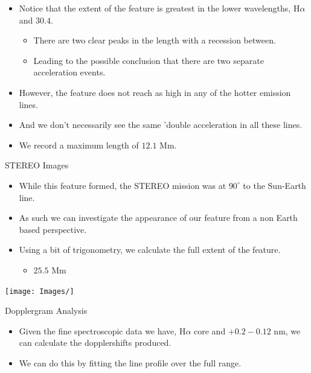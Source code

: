 \documentclass{beamer}
\begin{document}

	\begin{frame}
	\end{frame}


	\begin{frame}
		\begin{itemize}
			\item{Notice that the extent of the feature is greatest in the lower wavelengths, H$\alpha$ and $30.4$.}
			\begin{itemize}
				\item{There are two clear peaks in the length with a recession between.}
				\item{Leading to the possible conclusion that there are two separate acceleration events.}
			\end{itemize}
			\item{However, the feature does not reach as high in any of the hotter emission lines.}
			\item{And we don't necessarily see the same 'double acceleration in all these lines.}
			\item{We record a maximum length of $12.1$ Mm.}
		\end{itemize}
	\end{frame}

	
	\begin{frame}{STEREO Images}
		\begin{itemize}
			\item{While this feature formed, the STEREO mission was at $90^\circ$ to the Sun-Earth line.}
			\item{As such we can investigate the appearance of our feature from a non Earth based perspective.}
			\item{Using a bit of trigonometry, we calculate the full extent of the feature.}
			\begin{itemize}
				\item{$\mathbf{25.5}$ Mm}
			\end{itemize}
		\end{itemize}
		\texttt{[image: Images/]}
	\end{frame}
	
	\begin{frame}{Dopplergram Analysis}
		\begin{itemize}
			\item{Given the fine spectroscopic data we have, H$\alpha$ core and $+0.2 -0.12$ nm, we can calculate the dopplershifts produced.}
			\item{We can do this by fitting the line profile over the full range.}
		\end{itemize}
	\end{frame}
	
\end{document}
